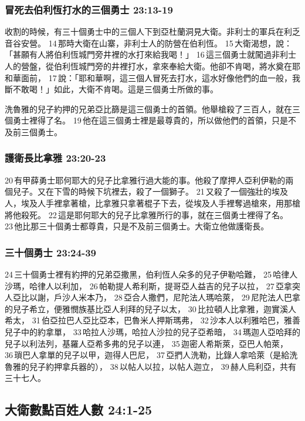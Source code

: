 \subsubsection{冒死去伯利恆打水的三個勇士 23:13-19}
收割的時候，有三十個勇士中的三個人下到亞杜蘭洞見大衛。非利士的軍兵在利乏音谷安營。 14 那時大衛在山寨，非利士人的防營在伯利恆。 15 大衛渴想，說：「甚願有人將伯利恆城門旁井裡的水打來給我喝！」 16 這三個勇士就闖過非利士人的營盤，從伯利恆城門旁的井裡打水，拿來奉給大衛。他卻不肯喝，將水奠在耶和華面前， 17 說：「耶和華啊，這三個人冒死去打水，這水好像他們的血一般，我斷不敢喝！」如此，大衛不肯喝。這是三個勇士所做的事。

洗魯雅的兒子約押的兄弟亞比篩是這三個勇士的首領。他舉槍殺了三百人，就在三個勇士裡得了名。 19 他在這三個勇士裡是最尊貴的，所以做他們的首領，只是不及前三個勇士。

\subsubsection{護衛長比拿雅 23:20-23}
20 有甲薛勇士耶何耶大的兒子比拿雅行過大能的事。他殺了摩押人亞利伊勒的兩個兒子。又在下雪的時候下坑裡去，殺了一個獅子。 21 又殺了一個強壯的埃及人，埃及人手裡拿著槍，比拿雅只拿著棍子下去，從埃及人手裡奪過槍來，用那槍將他殺死。 22 這是耶何耶大的兒子比拿雅所行的事，就在三個勇士裡得了名。 23 他比那三十個勇士都尊貴，只是不及前三個勇士。大衛立他做護衛長。
\subsubsection{三十個勇士 23:24-39}
24 三十個勇士裡有約押的兄弟亞撒黑，伯利恆人朵多的兒子伊勒哈難， 25 哈律人沙瑪，哈律人以利加， 26 帕勒提人希利斯，提哥亞人益吉的兒子以拉， 27 亞拿突人亞比以謝，戶沙人米本乃， 28 亞合人撒們，尼陀法人瑪哈萊， 29 尼陀法人巴拿的兒子希立，便雅憫族基比亞人利拜的兒子以太， 30 比拉頓人比拿雅，迦實溪人希太， 31 伯亞拉巴人亞比亞本，巴魯米人押斯瑪弗， 32 沙本人以利雅哈巴，雅善兒子中的約拿單， 33 哈拉人沙瑪，哈拉人沙拉的兒子亞希暗， 34 瑪迦人亞哈拜的兒子以利法列，基羅人亞希多弗的兒子以連， 35 迦密人希斯萊，亞巴人帕萊， 36 瑣巴人拿單的兒子以甲，迦得人巴尼， 37 亞捫人洗勒，比錄人拿哈萊（是給洗魯雅的兒子約押拿兵器的）， 38 以帖人以拉，以帖人迦立， 39 赫人烏利亞，共有三十七人。

\subsection{大衛數點百姓人數 24:1-25}
